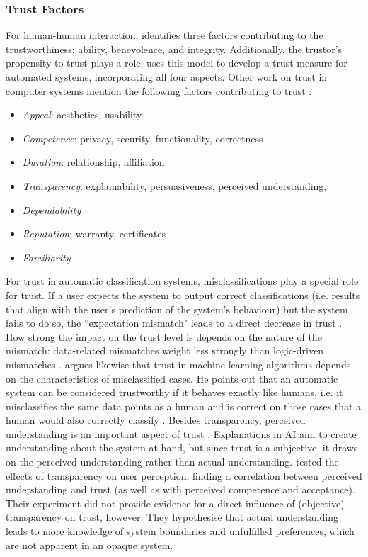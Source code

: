 \subsubsection{Trust Factors}
\label{subsubsec:trust_factors}
For human-human interaction, \cite{mayer1995integrative} identifies three factors contributing to the trustworthiness: ability, benevolence, and integrity. Additionally, the trustor's propensity to trust plays a role. \cite{korber2018theoretical} uses this model to develop a trust measure for automated systems, incorporating all four aspects. Other work on trust in computer systems mention the following factors contributing to trust \cite{artz2007survey, becker2006trustworthy, bedi2006assessing, corritore2005measuring, cramer2008effects, korber2018theoretical, mohammadi2013trustworthiness}:
\begin{itemize}
	\item \textit{Appeal}: aesthetics, usability
	\item \textit{Competence}: privacy, security, functionality, correctness
	\item \textit{Duration}: relationship, affiliation
	\item \textit{Transparency}: explainability, persuasiveness, perceived understanding, 
	\item \textit{Dependability}
	\item \textit{Reputation}: warranty, certificates
	\item \textit{Familiarity}
\end{itemize}
For trust in automatic classification systems, misclassifications play a special role for trust. If a user expects the system to output correct classifications (i.e. results that align with the user's prediction of the system's behaviour) but the system fails to do so, the ``expectation mismatch" leads to a direct decrease in trust \cite{glass2008toward}. How strong the impact on the trust level is depends on the nature of the mismatch: data-related mismatches weight less strongly than logic-driven mismatches \cite{glass2008toward}. \cite{lipton2016mythos} argues likewise that trust in machine learning algorithms depends on the characteristics of misclassified cases. He points out that an automatic system can be considered trustworthy if it behaves exactly like humans, i.e. it misclassifies the same data points as a human and is correct on those cases that a human would also correctly classify \cite{lipton2016mythos}.\newline
Besides transparency, perceived understanding is an important aspect of trust \cite{cramer2008effects}. Explanations in AI aim to create understanding about the system at hand, but since trust is a subjective, it draws on the perceived understanding rather than actual understanding. \cite{cramer2008effects} tested the effects of transparency on user perception, finding a correlation between perceived understanding and trust (as well as with perceived competence and acceptance). Their experiment did not provide evidence for a direct influence of (objective) transparency on trust, however. They hypothesise that actual understanding leads to more knowledge of system boundaries and unfulfilled preferences, which are not apparent in an opaque system. 


